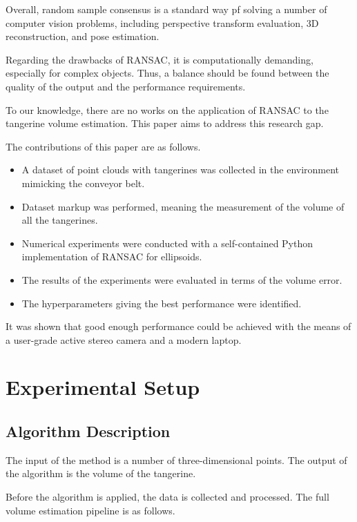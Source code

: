 Overall, random sample consensus is a standard way pf solving a number of computer vision problems, including perspective transform evaluation, 3D reconstruction\cite{nyalala2019}, and pose estimation.

Regarding the drawbacks of RANSAC, it is computationally demanding, especially for complex objects.
Thus, a balance should be found between the quality of the output and the performance requirements.

To our knowledge, there are no works on the application of RANSAC to the tangerine volume estimation.
This paper aims to address this research gap.

The contributions of this paper are as follows.
\begin{itemize}
    \item A dataset of point clouds with tangerines was collected in the environment mimicking the conveyor belt.
    \item Dataset markup was performed, meaning the measurement of the volume of all the tangerines.
    \item Numerical experiments were conducted with a self-contained Python implementation of RANSAC for ellipsoids.
    \item The results of the experiments were evaluated in terms of the volume error.
    \item The hyperparameters giving the best performance were identified.
\end{itemize}

It was shown that good enough performance could be achieved with the means of a user-grade active stereo camera and a modern laptop.

\section{Experimental Setup}

\subsection{Algorithm Description}

The input of the method is a number of three-dimensional points.
The output of the algorithm is the volume of the tangerine.

Before the algorithm is applied, the data is collected and processed.
The full volume estimation pipeline is as follows.

